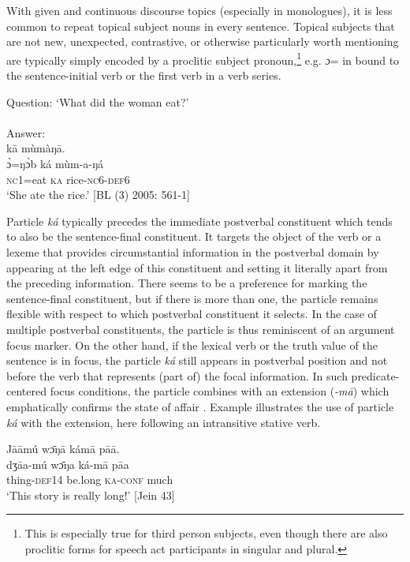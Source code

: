 \documentclass[output=paper]{langsci/langscibook}
\begin{document}
With given and continuous discourse topics (especially in monologues), it is less common to repeat topical subject nouns in every sentence. Topical subjects that are not new, unexpected, contrastive, or otherwise particularly worth mentioning are typically simply encoded by a proclitic subject pronoun,\footnote{This is especially true for third person subjects, even though there are also proclitic forms for speech act participants in singular and plural.} e.g. \textit{ɔ}= in  bound to the sentence-initial verb or the first verb in a verb series. 

\ea\label{ex:schwarz:8}
Question: `What did the woman eat?'\\
\textup{ } \\
Answer:\\
  k\={a}  mùmàŋ\={a}.\\
  \textup{\`ɔ=ŋ\`ɔb}    {ká}  {mùm-a-ŋá}\\
     \textsc{nc1}=eat  \textsc{ka}  rice-\textsc{nc}6-\textsc{def}6\\
\glt ‘She ate the rice.’ [BL (3) 2005: 561-1]
\z

Particle \textit{ká} typically precedes the immediate postverbal constituent which tends to also be the sentence-final constituent. It targets the object of the verb or a lexeme that provides circumstantial information in the postverbal domain by appearing at the left edge of this constituent and setting it literally apart from the preceding information. There seems to be a preference for marking the sentence-final constituent, but if there is more than one, the particle remains flexible with respect to which postverbal constituent it selects. In the case of multiple postverbal constituents, the particle is thus reminiscent of an argument focus marker. On the other hand, if the lexical verb or the truth value of the sentence is in focus, the particle \textit{ká} still appears in postverbal position and not before the verb that represents (part of) the focal information. In such predicate-centered focus conditions, the particle combines with an extension (\textit{-m\={a}}) which emphatically confirms the state of affair \citep{Schwarz2010b}. Example  illustrates the use of particle \textit{ká} with the extension, here following an intransitive stative verb.

\ea\label{ex:schwarz:9}
\glll   J\={a}\={a}mú    w\={ɔ}ŋ\={a}    kám\={a}    p\={a}\={a}.\\
  \textup{dʒ\={a}a-mú}  w\={ɔ}ŋa    {ká-m\={a}}    {p\={a}a}\\
thing-\textsc{def}14  be.long  \textsc{ka}-\textsc{conf}  much\\
\glt ‘This story is really long!’ [Jein 43]
\z
\end{document}
